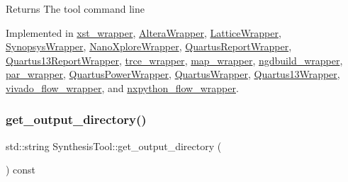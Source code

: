 \begin{DoxyReturn}{Returns}
The tool command line 
\end{DoxyReturn}


Implemented in \hyperlink{classxst__wrapper_a855756749f4d6ba8b04072b3f9439c10}{xst\+\_\+wrapper}, \hyperlink{classAlteraWrapper_a1b6c44694f0bd28b6f458245fd373326}{Altera\+Wrapper}, \hyperlink{classLatticeWrapper_ae568633c4a822e32b6ca75f9c12bf141}{Lattice\+Wrapper}, \hyperlink{classSynopsysWrapper_a4d08b4d2ce868e213182fcd405022023}{Synopsys\+Wrapper}, \hyperlink{classNanoXploreWrapper_a9aa78eed555faf8bc6970e05f7f8497c}{Nano\+Xplore\+Wrapper}, \hyperlink{classQuartusReportWrapper_a1f864436a60dc37ac6cdaa03c720a0a6}{Quartus\+Report\+Wrapper}, \hyperlink{classQuartus13ReportWrapper_a3497e8b5f3941355beb7c64ee771b5ff}{Quartus13\+Report\+Wrapper}, \hyperlink{classtrce__wrapper_a0ee76e5b1df405878bf02bc597513e23}{trce\+\_\+wrapper}, \hyperlink{classmap__wrapper_ac788d77f3b80833d49e2dbce39038a1a}{map\+\_\+wrapper}, \hyperlink{classngdbuild__wrapper_a9ce156e74518cda8ec42ff2e5bc43237}{ngdbuild\+\_\+wrapper}, \hyperlink{classpar__wrapper_aee784dea142fbce12724b9da547d4e9f}{par\+\_\+wrapper}, \hyperlink{classQuartusPowerWrapper_aa1ec11014b508f11b22e8882d53d3cb2}{Quartus\+Power\+Wrapper}, \hyperlink{classQuartusWrapper_af543e4704f8dba7bf429b1c9ce58ac58}{Quartus\+Wrapper}, \hyperlink{classQuartus13Wrapper_aa3d9af79c6ebd372589c482dd6fc3eab}{Quartus13\+Wrapper}, \hyperlink{classvivado__flow__wrapper_a26a19ae9d3f2cd1682a06873348f7731}{vivado\+\_\+flow\+\_\+wrapper}, and \hyperlink{classnxpython__flow__wrapper_ad88b053a2d5f727075d1e8dc2d574863}{nxpython\+\_\+flow\+\_\+wrapper}.

\mbox{\label{classSynthesisTool_ad4f150b7542b6574b43aac22f356c163}} 
\subsubsection{\texorpdfstring{get\+\_\+output\+\_\+directory()}{get\_output\_directory()}}
{\footnotesize\ttfamily std\+::string Synthesis\+Tool\+::get\+\_\+output\+\_\+directory (\begin{DoxyParamCaption}{ }\end{DoxyParamCaption}) const}



